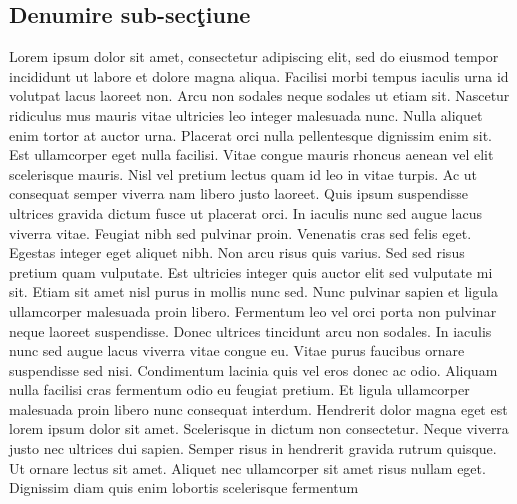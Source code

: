 \subsection{Denumire sub-sec\c{t}iune}
Lorem ipsum dolor sit amet, consectetur adipiscing elit, sed do eiusmod tempor incididunt ut labore et dolore magna aliqua. Facilisi morbi tempus iaculis urna id volutpat lacus laoreet non. Arcu non sodales neque sodales ut etiam sit. Nascetur ridiculus mus mauris vitae ultricies leo integer malesuada nunc. Nulla aliquet enim tortor at auctor urna. Placerat orci nulla pellentesque dignissim enim sit. Est ullamcorper eget nulla facilisi. Vitae congue mauris rhoncus aenean vel elit scelerisque mauris. Nisl vel pretium lectus quam id leo in vitae turpis. Ac ut consequat semper viverra nam libero justo laoreet. Quis ipsum suspendisse ultrices gravida dictum fusce ut placerat orci. In iaculis nunc sed augue lacus viverra vitae. Feugiat nibh sed pulvinar proin. Venenatis cras sed felis eget. Egestas integer eget aliquet nibh. Non arcu risus quis varius. Sed sed risus pretium quam vulputate.
Est ultricies integer quis auctor elit sed vulputate mi sit. Etiam sit amet nisl purus in mollis nunc sed. Nunc pulvinar sapien et ligula ullamcorper malesuada proin libero. Fermentum leo vel orci porta non pulvinar neque laoreet suspendisse. Donec ultrices tincidunt arcu non sodales. In iaculis nunc sed augue lacus viverra vitae congue eu. Vitae purus faucibus ornare suspendisse sed nisi. Condimentum lacinia quis vel eros donec ac odio. Aliquam nulla facilisi cras fermentum odio eu feugiat pretium. Et ligula ullamcorper malesuada proin libero nunc consequat interdum. Hendrerit dolor magna eget est lorem ipsum dolor sit amet. Scelerisque in dictum non consectetur. Neque viverra justo nec ultrices dui sapien. Semper risus in hendrerit gravida rutrum quisque. Ut ornare lectus sit amet. Aliquet nec ullamcorper sit amet risus nullam eget. Dignissim diam quis enim lobortis scelerisque fermentum

